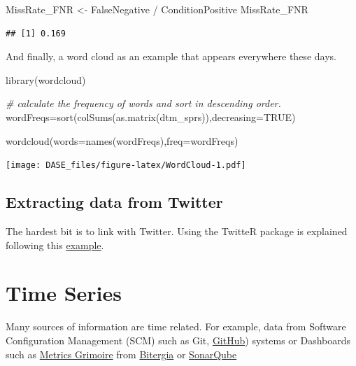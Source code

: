 \documentclass[
]{book}
\newenvironment{Shaded}{\begin{snugshade}}{\end{snugshade}}
\newcommand{\AttributeTok}[1]{\textcolor[rgb]{0.77,0.63,0.00}{#1}}
\newcommand{\CommentTok}[1]{\textcolor[rgb]{0.56,0.35,0.01}{\textit{#1}}}
\newcommand{\ConstantTok}[1]{\textcolor[rgb]{0.00,0.00,0.00}{#1}}
\newcommand{\FunctionTok}[1]{\textcolor[rgb]{0.00,0.00,0.00}{#1}}
\newcommand{\NormalTok}[1]{#1}
\newcommand{\OtherTok}[1]{\textcolor[rgb]{0.56,0.35,0.01}{#1}}
\newcommand{\SpecialCharTok}[1]{\textcolor[rgb]{0.00,0.00,0.00}{#1}}
\begin{document}
\begin{Shaded}
\begin{Highlighting}[]
\NormalTok{MissRate\_FNR }\OtherTok{\textless{}{-}}\NormalTok{ FalseNegative }\SpecialCharTok{/}\NormalTok{ ConditionPositive}
\NormalTok{MissRate\_FNR }
\end{Highlighting}
\end{Shaded}

\begin{verbatim}
## [1] 0.169
\end{verbatim}

And finally, a word cloud as an example that appears everywhere these days.

\begin{Shaded}
\begin{Highlighting}[]
\FunctionTok{library}\NormalTok{(wordcloud)}

\CommentTok{\# calculate the frequency of words and sort in descending order.}
\NormalTok{wordFreqs}\OtherTok{=}\FunctionTok{sort}\NormalTok{(}\FunctionTok{colSums}\NormalTok{(}\FunctionTok{as.matrix}\NormalTok{(dtm\_sprs)),}\AttributeTok{decreasing=}\ConstantTok{TRUE}\NormalTok{)}

\FunctionTok{wordcloud}\NormalTok{(}\AttributeTok{words=}\FunctionTok{names}\NormalTok{(wordFreqs),}\AttributeTok{freq=}\NormalTok{wordFreqs)}
\end{Highlighting}
\end{Shaded}

\texttt{[image: DASE\_files/figure-latex/WordCloud-1.pdf]}

\hypertarget{extracting-data-from-twitter}{%
\section{Extracting data from Twitter}\label{extracting-data-from-twitter}}

The hardest bit is to link with Twitter. Using the TwitteR package is explained following this \href{./twitter.Rmd}{example}.

\hypertarget{time-series}{%
\chapter{Time Series}\label{time-series}}

Many sources of information are time related. For example, data from Software Configuration Management (SCM) such as Git, \href{http://www.github.com}{GitHub}) systems or Dashboards such as \href{http://metricsgrimoire.github.io/}{Metrics Grimoire} from \href{http://bitergia.com/}{Bitergia} or \href{http://www.sonarqube.org/}{SonarQube}
\end{document}
